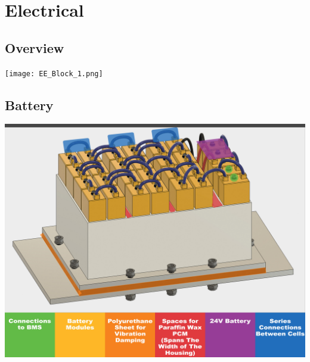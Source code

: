 \documentclass[main.tex]{subfiles}
\begin{document}
    \chapter{Electrical}
    \label{ch:electrical}

	\section{Overview}
    \texttt{[image: EE\_Block\_1.png]}
    \section{Battery}
      \includegraphics[width=\linewidth]{images/battery_description.jpg}
\end{document}
